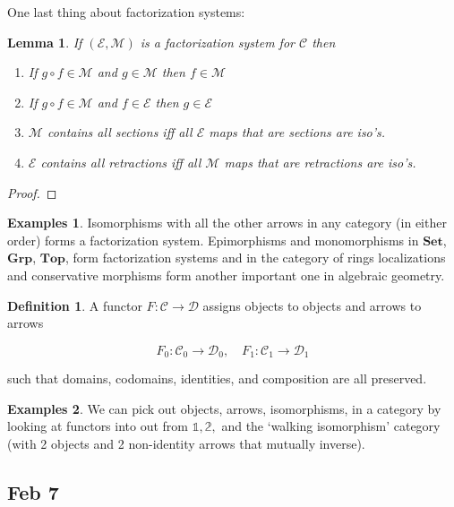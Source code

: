 \documentclass[11pt]{amsart}
\theoremstyle{plain}
\newtheorem{lem}[thm]{Lemma}
\theoremstyle{definition}
\newtheorem{defn}[thm]{Definition}
\newtheorem*{egs*}{Examples}
\newcommand{\cC}{{\mathcal C}}
\newcommand{\cD}{{\mathcal D}}
\newcommand{\cE}{{\mathcal E}}
\newcommand{\cM}{{\mathcal M}}
\newcommand{\Top}{\mathbf{Top}}
\newcommand{\Set}{{\mathbf{Set}}}
\newcommand{\Grp}{\mathbf{Grp}}
\newcommand{\noi}{{\noindent}}
\begin{document}
One last thing about factorization systems: 

\begin{lem}
If $(\cE, \cM)$ is a factorization system for $\cC$ then 

\begin{enumerate}
\item If $g \circ f \in \cM$ and $g \in \cM$ then $f \in \cM$
\item If $g \circ f \in \cM$ and $f \in \cE$ then $g \in \cE$
\item $\cM$ contains all sections iff all $\cE$ maps that are sections are iso's. 
\item $\cE$ contains all retractions iff all $\cM$ maps that are retractions are iso's. 
\end{enumerate}
\end{lem}
\begin{proof}
\end{proof}

\begin{egs*}
Isomorphisms with all the other arrows in any category (in either order) forms a factorization system. Epimorphisms and monomorphisms in $\Set$, $\Grp$, $\Top$, form factorization systems and in the category of rings localizations and conservative morphisms form another important one in algebraic geometry. 
\end{egs*}

\begin{defn}
A functor $F : \cC \to \cD$ assigns objects to objects and arrows to arrows 

\[ F_0 : \cC_0 \to \cD_0 , \quad F_1 : \cC_1 \to \cD_1\]

\noi such that domains, codomains, identities, and composition are all preserved. 
\end{defn}

\begin{egs*}
We can pick out objects, arrows, isomorphisms, in a category by looking at functors into out from $\mathbb{1}, \mathbb{2},$ and the `walking isomorphism' category (with 2 objects and 2 non-identity arrows that mutually inverse). 
\end{egs*}




\subsection{Feb 7}
\end{document}
